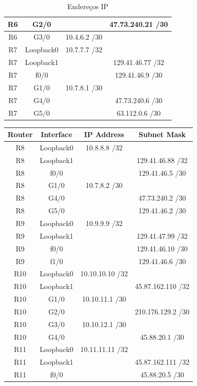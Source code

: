 \documentclass[11pt,english, openright, oneside]{book}
\begin{document}
\begin{table}[H]
\begin{tabular}{|c|c|c|c|}
R6 & G2/0 & & 47.73.240.21 /30\\ \hline
R6 & G3/0 & 10.4.6.2 /30& \\ \hline
R7 & Loopback0 & 10.7.7.7 /32 & \\ \hline
R7 & Loopback1 & & 129.41.46.77 /32 \\ \hline
R7 & f0/0 & & 129.41.46.9 /30 \\ \hline
R7 & G1/0 & 10.7.8.1 /30 & \\ \hline
R7 & G4/0 & & 47.73.240.6 /30 \\ \hline
R7 & G5/0 & & 63.112.0.6 /30 \\ \hline
\end{tabular}
\caption{Endereços IP}
\label{tab:ip1}
\end{table}

\begin{table}[H]
\centering
\begin{tabular}{|c|c|c|c|}
\hline
\textbf{Router} & \textbf{Interface} & \textbf{IP Address} & \textbf{Subnet Mask} \\ \hline
R8 & Loopback0 & 10.8.8.8 /32 & \\ \hline
R8 & Loopback1 & & 129.41.46.88 /32 \\ \hline
R8 & f0/0 & & 129.41.46.5 /30 \\ \hline
R8 & G1/0 & 10.7.8.2 /30 & \\ \hline
R8 & G4/0 & & 47.73.240.2 /30 \\ \hline
R8 & G5/0 & & 129.41.46.2 /30 \\ \hline
R9 & Loopback0 & 10.9.9.9 /32 & \\ \hline
R9 & Loopback1 & & 129.41.47.99 /32 \\ \hline
R9 & f0/0 & & 129.41.46.10 /30 \\ \hline
R9 & f1/0 & & 129.41.46.6 /30\\ \hline
R10 & Loopback0 & 10.10.10.10 /32 & \\ \hline
R10 & Loopback1 & & 45.87.162.110 /32 \\ \hline
R10 & G1/0 & 10.10.11.1 /30 & \\ \hline
R10 & G2/0 & & 210.176.129.2 /30 \\ \hline
R10 & G3/0 & 10.10.12.1 /30 & \\ \hline
R10 & G4/0 & & 45.88.20.1 /30 \\ \hline
R11 & Loopback0 & 10.11.11.11 /32 & \\ \hline
R11 & Loopback1 & & 45.87.162.111 /32 \\ \hline
R11 & f0/0 & & 45.88.20.5 /30 \\ \hline

\end{tabular}
\end{table}
\end{document}
